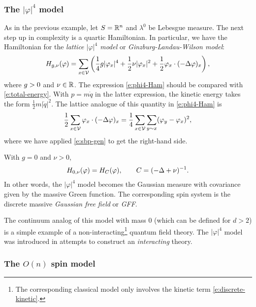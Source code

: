 \subsubsection{The $|\varphi|^4$ model}

As in the previous example, let $S = {\mathbb R}^n$ and $\lambda^0$ be Lebesgue measure.
The next step up in complexity is a quartic Hamiltonian. In particular, we have
the Hamiltonian for the \emph{lattice $|\varphi|^4$ model} or \emph{Ginzburg-Landau-Wilson model}:
\begin{equation}
\label{e:phi4-Ham}
H_{g,\nu}(\varphi)
  =
\sum_{x\in\mathcal{V}}
\left(
  \frac{1}{4} g |\varphi_x|^4
    +
  \frac{1}{2} \nu |\varphi_x|^2
    +
  \frac{1}{2} \varphi_x \cdot (-\Delta \varphi)_x
\right),
\end{equation}
where $g > 0$ and $\nu\in{\mathbb R}$.
The expression \eqref{e:phi4-Ham} should be compared with \eqref{e:total-energy}.
With $p = m \dot q$ in the latter expression, the kinetic energy takes the form
$\tfrac12 m |\dot q|^2$. The lattice analogue of this quantity in \eqref{e:phi4-Ham} is
\begin{equation}
\label{e:discrete-kinetic}
\frac12 \sum_{x\in\mathcal{V}} \varphi_x \cdot (-\Delta \varphi)_x
	=
\frac14 \sum_{x\in\mathcal{V}} \sum_{y\sim x} (\varphi_y - \varphi_x)^2,
\end{equation}
where we have applied \eqref{e:sbp-gen} to get the right-hand side.

\begin{example}
With $g = 0$ and $\nu > 0$,
\begin{equation}
H_{0,\nu}(\varphi) = H_C(\varphi),
	\qquad
C = (-\Delta + \nu)^{-1}.
\end{equation}
In other words, the $|\varphi|^4$ model becomes the Gaussian measure with covariance given
by the massive Green function. The corresponding spin system is the discrete massive
\emph{Gaussian free field} or \emph{GFF}.

The continuum analog of this model with mass $0$
(which can be defined for $d > 2$) is a simple example of a
non-interacting\footnote{The corresponding classical model only involves the kinetic term
\eqref{e:discrete-kinetic}.} quantum field theory. The $|\varphi|^4$ model was introduced
in attempts to construct an \emph{interacting} theory.
\end{example}

\subsubsection{The $O(n)$ spin model}

